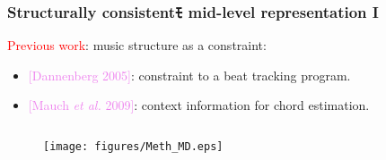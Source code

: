 \documentclass[12pt]{beamer}
\begin{document}
\begin{frame}
\frametitle{Structurally consistentﾓ mid-level representation I}

\textcolor{red}{Previous work}: music structure as a constraint:	
\begin{itemize}	
	\item \textcolor{violet}{[Dannenberg 2005]}: constraint to a beat tracking program.	
	\item \textcolor{violet}{[Mauch \textit{et al.} 2009]}: context information for chord estimation.	
\end{itemize}
\bigskip



	
\begin{columns}[c] 

\begin{column}{0.5\textwidth} 
\vspace{-0.4cm}
\begin{figure}[htb]
   \centering
   \texttt{[image: figures/Meth\_MD.eps]}%
\end{figure}
\end{column} 


\end{columns}
\end{frame}
\end{document}
